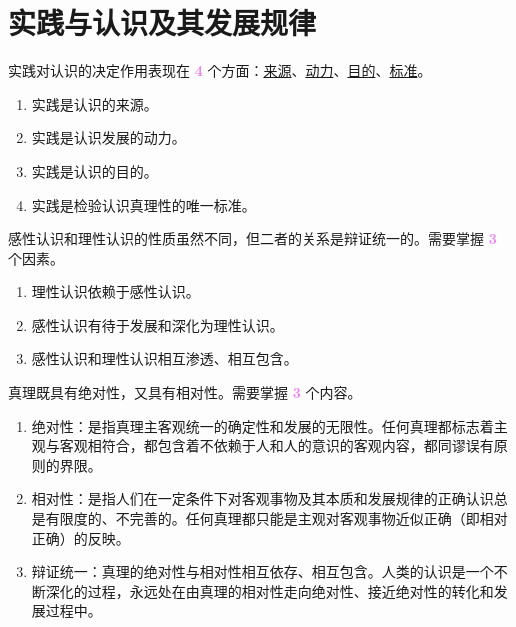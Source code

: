 \documentclass[UTF8]{ctexart}
\newcommand\Concept[1]{\colorbox{cyan!10!white}{\textcolor{cyan!40!black}{#1}}}
\newcommand\Emph[1]{\colorbox{violet!10}{\textcolor{violet}{\bfseries #1}}}
\newcommand\Example[1]{\textcolor{cyan!70!black}{\small #1}}
\newcommand\pos[1]{\hspace{0pt} \marginpar{\footnotesize\textcolor{yellow!50!black}{\hfill #1}}}
\begin{document}
\section{实践与认识及其发展规律}
\begin{description}[itemsep=0pt]
    \item[\Concept{实践对认识的决定作用}] \pos{p79} 实践对认识的决定作用表现在 \Emph{4} 个方面：\uline{来源}、\uline{动力}、\uline{目的}、\uline{标准}。
    \Example{\begin{enumerate}[itemsep=0pt, parsep=0pt, leftmargin=15pt]
            \item 实践是认识的来源。
            \item 实践是认识发展的动力。
            \item 实践是认识的目的。
            \item 实践是检验认识真理性的唯一标准。
        \end{enumerate}}

    \item[\Concept{感性和理性认识}] \pos{p85} 感性认识和理性认识的性质虽然不同，但二者的关系是辩证统一的。需要掌握 \Emph{3} 个因素。
    \Example{\begin{enumerate}[itemsep=0pt, parsep=0pt, leftmargin=15pt]
            \item 理性认识依赖于感性认识。
            \item 感性认识有待于发展和深化为理性认识。
            \item 感性认识和理性认识相互渗透、相互包含。
        \end{enumerate}}

    \item[\Concept{真理的绝对性和相对性}] \pos{p93} 真理既具有绝对性，又具有相对性。需要掌握 \Emph{3} 个内容。
    \Example{\begin{enumerate}[itemsep=0pt, parsep=0pt, leftmargin=15pt]
            \item 绝对性：是指真理主客观统一的确定性和发展的无限性。任何真理都标志着主观与客观相符合，都包含着不依赖于人和人的意识的客观内容，都同谬误有原则的界限。
            \item 相对性：是指人们在一定条件下对客观事物及其本质和发展规律的正确认识总是有限度的、不完善的。任何真理都只能是主观对客观事物近似正确（即相对正确）的反映。
            \item 辩证统一：真理的绝对性与相对性相互依存、相互包含。人类的认识是一个不断深化的过程，永远处在由真理的相对性走向绝对性、接近绝对性的转化和发展过程中。
        \end{enumerate}}


\end{description}
\end{document}
